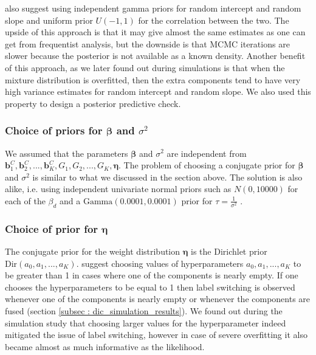  \citet[pg. 260]{lesaffre_bayesian_2012} also suggest using independent gamma priors for random intercept and random slope and uniform prior $U(-1,1)$ for the correlation between the two. The upside of this approach is that it may give almost the same estimates as one can get from frequentist analysis, but the downside is that MCMC iterations are slower because the posterior is not available as a known density. Another benefit of this approach, as we later found out during simulations is that when the mixture distribution is overfitted, then the extra components tend to have very high variance estimates for random intercept and random slope. We also used this property to design a posterior predictive check.

\subsubsection{Choice of priors for $\boldsymbol{\beta}$ and $\sigma^2$}
We assumed that the parameters $\boldsymbol{\beta}$ and $\sigma^2$ are independent from $\boldsymbol{b}_1^C, \boldsymbol{b}_2^C, ..., \boldsymbol{b}_K^C, G_1, G_2, ..., G_K, \boldsymbol{\eta}$. The problem of choosing a conjugate prior for $\boldsymbol{\beta}$ and $\sigma^2$ is similar to what we discussed in the section above. The solution is also alike, i.e. using independent univariate normal priors such as $N(0, 10000)$ for each of the $\beta_d$ and a $\text{Gamma}(0.0001, 0.0001)$ prior for $\tau = \frac 1 {\sigma^2}$ \citep[chap. 17]{gelman_data_2006}.

\subsubsection{Choice of prior for $\boldsymbol{\eta}$}
The conjugate prior for the weight distribution $\boldsymbol{\eta}$ is the Dirichlet prior $\text{Dir}(a_0, a_1,..., a_K)$. \citet[pg. 105]{fruhwirth-schnatter_finite_2013} suggest choosing values of hyperparameters $a_0, a_1,..., a_K$ to be greater than 1 in cases where one of the components is nearly empty. If one chooses the hyperparameters to be equal to 1 then label switching is observed whenever one of the components is nearly empty or whenever the components are fused (section \ref{subsec : dic_simulation_results}). We found out during the simulation study that choosing larger values for the hyperparameter indeed mitigated the issue of label switching, however in case of severe overfitting it also became almost as much informative as the likelihood.

